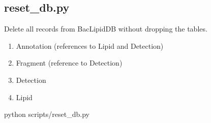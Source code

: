 \documentclass[letterpaper,10pt,english]{sphinxmanual}
\begin{document}
\subsection{reset\_db.py}
\label{\detokenize{api:reset-db-py}}
\sphinxAtStartPar
Delete all records from BacLipidDB without dropping the tables.
\begin{description}
\begin{enumerate}
%
\item {} 
\sphinxAtStartPar
Annotation  (references to Lipid and Detection)

\item {} 
\sphinxAtStartPar
Fragment    (reference to Detection)

\item {} 
\sphinxAtStartPar
Detection

\item {} 
\sphinxAtStartPar
Lipid

\end{enumerate}

\sphinxAtStartPar
python scripts/reset\_db.py

\end{description}

\begin{fulllineitems}
\label{\detokenize{api:scripts.reset_db.reset_db}}
\pysigstartsignatures
\pysiglinewithargsret
{}
{}
{}
\pysigstopsignatures
\end{fulllineitems}
\end{document}
